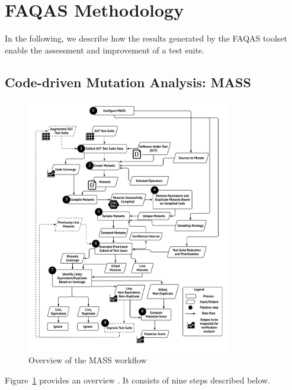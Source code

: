 
\section{FAQAS Methodology}

\STARTCHANGEDWPT

In the following, we describe how the results generated by the FAQAS toolset enable the assessment and improvement of a test suite.


\subsection{Code-driven Mutation Analysis: MASS}
\label{sec:meth:mass}


\begin{figure}[tb]
\begin{center}
\includegraphics[width=0.8\textwidth]{images/MASS-extended.pdf}
\caption{Overview of the MASS workflow}
\label{fig:MASS}
\end{center}
\end{figure}

Figure~\ref{fig:MASS} provides an overview \MASS. It consists of nine steps described below.

